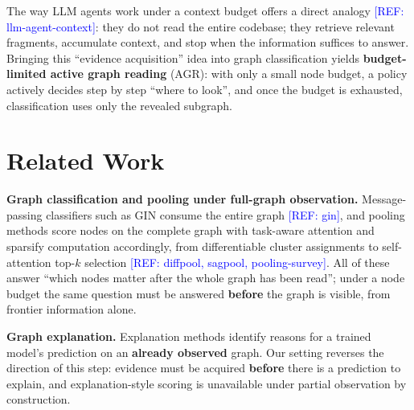 \documentclass{article}
\newcommand{\refadd}[1]{\textcolor{blue}{[REF: #1]}}
\begin{document}
The way LLM agents work under a context budget offers a direct analogy \refadd{llm-agent-context}: they do not read the entire codebase; they retrieve relevant fragments, accumulate context, and stop when the information suffices to answer. Bringing this ``evidence acquisition'' idea into graph classification yields \textbf{budget-limited active graph reading} (AGR): with only a small node budget, a policy actively decides step by step ``where to look'', and once the budget is exhausted, classification uses only the revealed subgraph.

\section{Related Work}
\label{sec:related}

\textbf{Graph classification and pooling under full-graph observation.} Message-passing classifiers such as GIN consume the entire graph \refadd{gin}, and pooling methods score nodes on the complete graph with task-aware attention and sparsify computation accordingly, from differentiable cluster assignments to self-attention top-$k$ selection \refadd{diffpool, sagpool, pooling-survey}. All of these answer ``which nodes matter after the whole graph has been read''; under a node budget the same question must be answered \textbf{before} the graph is visible, from frontier information alone.

\textbf{Graph explanation.} Explanation methods identify reasons for a trained model's prediction on an \textbf{already observed} graph. Our setting reverses the direction of this step: evidence must be acquired \textbf{before} there is a prediction to explain, and explanation-style scoring is unavailable under partial observation by construction.
\end{document}
